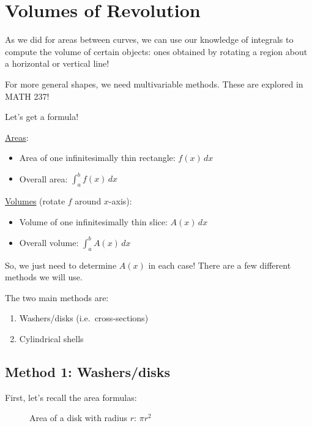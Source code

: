 \section{Volumes of Revolution}
As we did for areas between curves, we can use our knowledge of
integrals to compute the volume of certain objects: ones obtained
by rotating a region about a horizontal or vertical line!

\begin{Remark}{}{}
    For more general shapes, we need multivariable methods. These are
    explored in MATH 237!
\end{Remark}

Let's get a formula!

\underline{Areas}:
\begin{itemize}
    \item Area of one infinitesimally thin rectangle: $ f(x)\,dx $
    \item Overall area: $ \displaystyle \int_{a}^{b} f(x)\, d{x}  $
\end{itemize}
\underline{Volumes} (rotate $ f $ around $ x $-axis):
\begin{itemize}
    \item Volume of one infinitesimally thin slice: $ A(x)\,dx $
    \item Overall volume: $ \displaystyle \int_{a}^{b} A(x)\, d{x} $
\end{itemize}

So, we just need to determine $ A(x) $ in each case! There are
a few different methods we will use.

The two main methods are:
\begin{enumerate}[label=(\Roman*)]
    \item Washers/disks (i.e.\ cross-sections)
    \item Cylindrical shells
\end{enumerate}

\subsection*{Method 1: Washers/disks}

First, let's recall the area formulas:

\begin{figure}
    \centering
    \caption{Area of a disk with radius $ r $: $ \pi r^2 $}
\end{figure}

